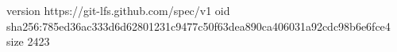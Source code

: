 version https://git-lfs.github.com/spec/v1
oid sha256:785ed36ac333d6d62801231c9477c50f63dea890ca406031a92cdc98b6e6fce4
size 2423
